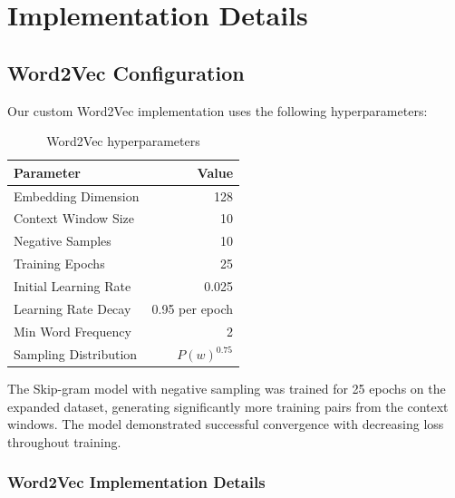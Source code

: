 \documentclass[11pt]{article}
\begin{document}
\section{Implementation Details}

\subsection{Word2Vec Configuration}

Our custom Word2Vec implementation uses the following hyperparameters:

\begin{table}[h]
\centering
\begin{tabular}{lr}
\toprule
\textbf{Parameter} & \textbf{Value} \\
\midrule
Embedding Dimension & 128 \\
Context Window Size & 10 \\
Negative Samples & 10 \\
Training Epochs & 25 \\
Initial Learning Rate & 0.025 \\
Learning Rate Decay & 0.95 per epoch \\
Min Word Frequency & 2 \\
Sampling Distribution & $P(w)^{0.75}$ \\
\bottomrule
\end{tabular}
\caption{Word2Vec hyperparameters}
\label{tab:w2v_params}
\end{table}

The Skip-gram model with negative sampling was trained for 25 epochs on the expanded dataset, generating significantly more training pairs from the context windows. The model demonstrated successful convergence with decreasing loss throughout training.

\subsubsection{Word2Vec Implementation Details}
\end{document}

